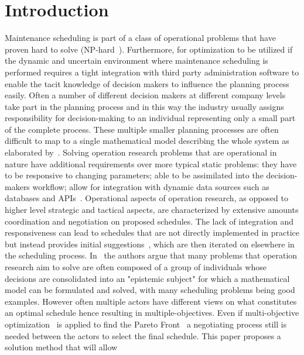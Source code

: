 \section{Introduction}
\label{sec:1-introduction}

Maintenance scheduling is part of a class of operational problems that have proven hard to solve (NP-hard~\citep{garey1979computers}).
Furthermore, for optimization to be utilized if the dynamic and uncertain environment where maintenance scheduling 
is performed requires a
tight integration with third party administration software to enable the tacit knowledge of decision makers to influence
the planning process easily. Often a number of different decision makers at different company levels take part in the
planning process and in this way the industry usually assigns responsibility for decision-making to an individual
representing only a small part of the complete process.  These multiple smaller planning processes are often difficult
to map to a single mathematical model describing the whole system as elaborated by~\citep{barthelemy2002human}. Solving
operation research problems that are operational in nature have additional requirements over more typical static
problems: they have to be responsive to changing parameters; able to be assimilated into the decision-makers workflow;
allow for integration with dynamic data sources such as databases and APIs~\citep{meignan_review_2015}. Operational
aspects of operation research, as opposed to higher level strategic and tactical aspects, are characterized by extensive
amounts coordination and negotiation on proposed schedules. The lack of integration and responsiveness can lead to schedules
that are not directly implemented in practice but instead provides initial suggestions~\citep{meignan_review_2015},
which are then iterated on elsewhere in the scheduling process. In~\citep{barthelemy2002human} the authors
argue that many problems that operation research aim to solve are often composed of a group of individuals
whose decisions are consolidated into an "epistemic subject" for which a mathematical model can be formulated
and solved, with many scheduling problems being good examples. However often multiple actors have different
views on what constitutes an optimal schedule hence resulting in multiple-objectives. Even if multi-objective
optimization~\citep{ehrgott2002multiple} is applied to find the Pareto Front~\citep{Pareto1897} a negotiating process
still is needed between the actors to select the final schedule. This paper proposes a solution method that will allow
